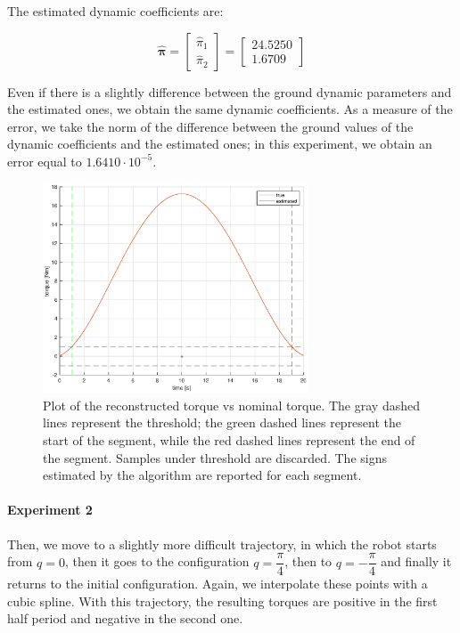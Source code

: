 \documentclass{article}
\begin{document}
The estimated dynamic coefficients are:

\[\bm{\hat{\pi}}= \begin{bmatrix}
\hat{\pi}_1 \\\hat{ \pi}_2
\end{bmatrix} =
\begin{bmatrix}
24.5250 \\ 1.6709
\end{bmatrix}\]

Even if there is a slightly difference between the ground dynamic parameters and the estimated ones, we obtain the same dynamic coefficients. As a measure of the error, we take the norm of the difference between the ground values of the dynamic coefficients and the estimated ones; in this experiment, we obtain an error equal to $1.6410\cdot10^{-5}$.

\begin{figure}[!htbp]
\centering
\includegraphics[width=0.7\textwidth]{images/1-dof/results1.eps}
\caption{Plot of the reconstructed torque vs nominal torque. The gray dashed lines represent the threshold; the green dashed lines represent the start of the segment, while the red dashed lines represent the end of the segment. Samples under threshold are discarded. The signs estimated by the algorithm are reported for each segment.}
\end{figure}
\FloatBarrier

\paragraph{Experiment 2}Then, we move to a slightly more difficult trajectory, in which the robot starts from $q = 0$, then it goes to the configuration $q = \dfrac{\pi}{4}$, then to $q = -\dfrac{\pi}{4}$ and finally it returns to the initial configuration. Again, we interpolate these points with a cubic spline. With this trajectory, the resulting torques are positive in the first half period and negative in the second one.
\end{document}
